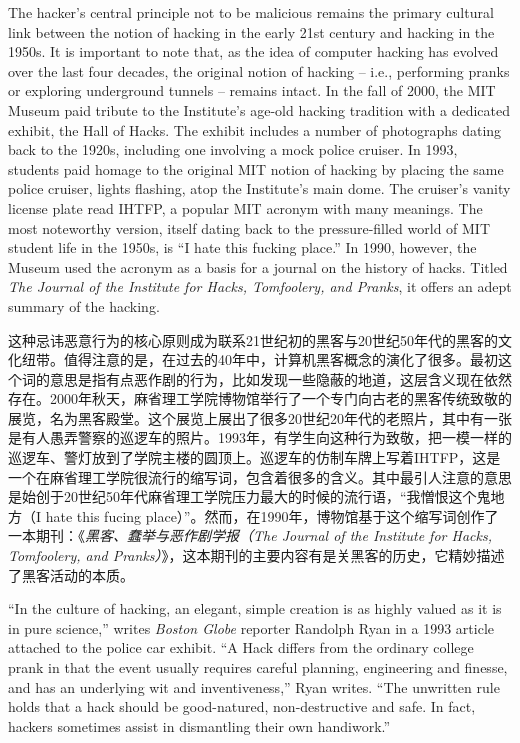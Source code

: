 \ifdefined\eng
The hacker's central principle not to be malicious remains the primary cultural link between the notion of hacking in the early 21st century and hacking in the 1950s. It is important to note that, as the idea of computer hacking has evolved over the last four decades, the original notion of hacking -- i.e., performing pranks or exploring underground tunnels -- remains intact. In the fall of 2000, the MIT Museum paid tribute to the Institute's age-old hacking tradition with a dedicated exhibit, the Hall of Hacks. The exhibit includes a number of photographs dating back to the 1920s, including one involving a mock police cruiser. In 1993, students paid homage to the original MIT notion of hacking by placing the same police cruiser, lights flashing, atop the Institute's main dome. The cruiser's vanity license plate read IHTFP, a popular MIT acronym with many meanings. The most noteworthy version, itself dating back to the pressure-filled world of MIT student life in the 1950s, is ``I hate this fucking place.'' In 1990, however, the Museum used the acronym as a basis for a journal on the history of hacks. Titled \textit{The Journal of the Institute for Hacks, Tomfoolery, and Pranks}, it offers an adept summary of the hacking.
\fi

\ifdefined\chs
这种忌讳恶意行为的核心原则成为联系21世纪初的黑客与20世纪50年代的黑客的文化纽带。值得注意的是，在过去的40年中，计算机黑客概念的演化了很多。最初这个词的意思是指有点恶作剧的行为，比如发现一些隐蔽的地道，这层含义现在依然存在。2000年秋天，麻省理工学院博物馆举行了一个专门向古老的黑客传统致敬的展览，名为黑客殿堂。这个展览上展出了很多20世纪20年代的老照片，其中有一张是有人愚弄警察的巡逻车的照片。1993年，有学生向这种行为致敬，把一模一样的巡逻车、警灯放到了学院主楼的圆顶上。巡逻车的仿制车牌上写着IHTFP，这是一个在麻省理工学院很流行的缩写词，包含着很多的含义。其中最引人注意的意思是始创于20世纪50年代麻省理工学院压力最大的时候的流行语，“我憎恨这个鬼地方（I hate this fucing place）”。然而，在1990年，博物馆基于这个缩写词创作了一本期刊：《\textit{黑客、蠢举与恶作剧学报（The Journal of the Institute for Hacks, Tomfoolery, and Pranks）}》，这本期刊的主要内容有是关黑客的历史，它精妙描述了黑客活动的本质。
\fi

\ifdefined\eng
``In the culture of hacking, an elegant, simple creation is as highly valued as it is in pure science,'' writes \textit{Boston Globe} reporter Randolph Ryan in a 1993 article attached to the police car exhibit. ``A Hack differs from the ordinary college prank in that the event usually requires careful planning, engineering and finesse, and has an underlying wit and inventiveness,'' Ryan writes. ``The unwritten rule holds that a hack should be good-natured, non-destructive and safe. In fact, hackers sometimes assist in dismantling their own handiwork.''
\fi

